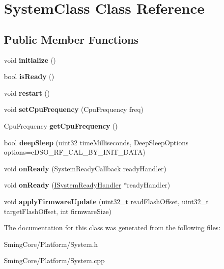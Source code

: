 \hypertarget{class_system_class}{}\section{System\+Class Class Reference}
\label{class_system_class}
\subsection*{Public Member Functions}
\begin{DoxyCompactItemize}
\item 
\hypertarget{class_system_class_a6f76530665629e2a2d0246fb63af9696}{}void {\bfseries initialize} ()\label{class_system_class_a6f76530665629e2a2d0246fb63af9696}

\item 
\hypertarget{class_system_class_a79a7cb0d48d4f5ae35722cfff45aa454}{}bool {\bfseries is\+Ready} ()\label{class_system_class_a79a7cb0d48d4f5ae35722cfff45aa454}

\item 
\hypertarget{class_system_class_a5f72899b23c49108b7cba82717e4246d}{}void {\bfseries restart} ()\label{class_system_class_a5f72899b23c49108b7cba82717e4246d}

\item 
\hypertarget{class_system_class_a820222ab31f457872e7bc645e998024f}{}void {\bfseries set\+Cpu\+Frequency} (Cpu\+Frequency freq)\label{class_system_class_a820222ab31f457872e7bc645e998024f}

\item 
\hypertarget{class_system_class_a4ee160d3a5da1913480bfee8c42df41a}{}Cpu\+Frequency {\bfseries get\+Cpu\+Frequency} ()\label{class_system_class_a4ee160d3a5da1913480bfee8c42df41a}

\item 
\hypertarget{class_system_class_a15eb21125083b655bb83f7dbd47f0987}{}bool {\bfseries deep\+Sleep} (uint32 time\+Milliseconds, Deep\+Sleep\+Options options=e\+D\+S\+O\+\_\+\+R\+F\+\_\+\+C\+A\+L\+\_\+\+B\+Y\+\_\+\+I\+N\+I\+T\+\_\+\+D\+A\+T\+A)\label{class_system_class_a15eb21125083b655bb83f7dbd47f0987}

\item 
\hypertarget{class_system_class_a4975b9d61d16329fe5cdbf71a06f8a79}{}void {\bfseries on\+Ready} (System\+Ready\+Callback ready\+Handler)\label{class_system_class_a4975b9d61d16329fe5cdbf71a06f8a79}

\item 
\hypertarget{class_system_class_a71e2a19d176b06ed76394b771a2cb487}{}void {\bfseries on\+Ready} (\hyperlink{class_i_system_ready_handler}{I\+System\+Ready\+Handler} $\ast$ready\+Handler)\label{class_system_class_a71e2a19d176b06ed76394b771a2cb487}

\item 
\hypertarget{class_system_class_a7dcef7d03311a356b501b6864a0b39ff}{}void {\bfseries apply\+Firmware\+Update} (uint32\+\_\+t read\+Flash\+Offset, uint32\+\_\+t target\+Flash\+Offset, int firmware\+Size)\label{class_system_class_a7dcef7d03311a356b501b6864a0b39ff}

\end{DoxyCompactItemize}


The documentation for this class was generated from the following files\+:\begin{DoxyCompactItemize}
\item 
Sming\+Core/\+Platform/System.\+h\item 
Sming\+Core/\+Platform/System.\+cpp\end{DoxyCompactItemize}
